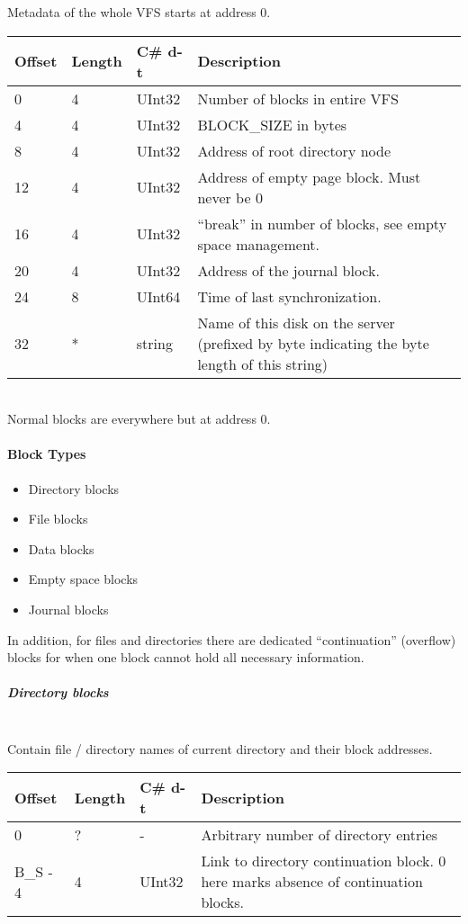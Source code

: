\documentclass[a4paper,12pt]{article}
\begin{document}
Metadata of the whole VFS starts at address 0.\\

\begin{tabular}{|p{1.5cm}|p{1.5cm}|p{1.5cm}|p{7cm}|}\hline
Offset 	&Length	&C\# d-t	&Description\\\hline
0	&4	&UInt32	&Number of blocks in entire VFS\\
4	&4	&UInt32	&BLOCK\_SIZE in bytes\\
8	&4	&UInt32	&Address of root directory node\\
12	&4	&UInt32	&Address of empty page block. Must never be 0\\
16	&4	&UInt32	&“break” in number of blocks, see empty space management.\\
20	&4	&UInt32	&Address of the journal block.\\
24	&8	&UInt64	&Time of last synchronization.\\
32	&*	&string	&Name of this disk on the server (prefixed by byte indicating the byte length of this string)\\
\hline
\end{tabular}\\

Normal blocks are everywhere but at address 0.

\paragraph{Block Types}

\begin{itemize}
	\item Directory blocks
	\item File blocks
	\item Data blocks
	\item Empty space blocks
	\item Journal blocks
\end{itemize}
In addition, for files and directories there are dedicated ``continuation'' (overflow) blocks for when one block cannot hold all necessary information. 

\subparagraph{Directory blocks} \mbox{} \\

Contain file / directory names of current directory and their block addresses.\\

\begin{tabular}{|p{1.5cm}|p{1.5cm}|p{1.5cm}|p{7cm}|}\hline
Offset 	&Length	&C\# d-t	&Description\\\hline
0	&?	&-	&Arbitrary number of directory entries\\
B\_S - 4	&4	&UInt32	&Link to directory continuation block. 0 here marks absence of continuation blocks.\\\hline
\end{tabular} \\
\end{document}
